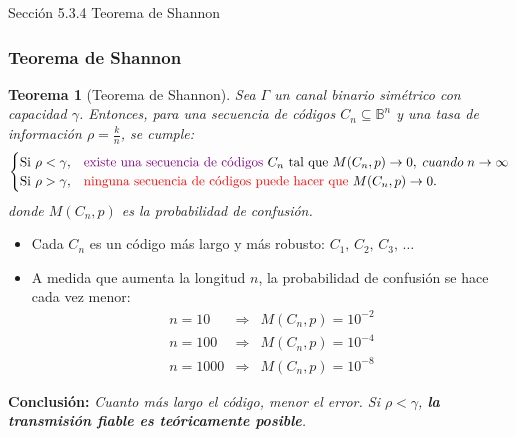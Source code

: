 \documentclass{beamer}
\theoremstyle{plain}
\newtheorem{teorema} [Teorema] {Teorema}
\theoremstyle{example}
\theoremstyle{example}
\begin{document}
\begin{frame}   \footnotesize
{
\begin{block}{Sección 5.3.4}
Teorema de Shannon
\end{block}
}
\end{frame}
\begin{frame}  \frametitle{Teorema de Shannon}\footnotesize  


\begin{teorema} [Teorema de Shannon]

Sea $\Gamma$ un canal binario simétrico con capacidad $\gamma$.
Entonces, para una secuencia de códigos $C_n \subseteq \mathbb{B}^n$ y
una tasa de información $\rho = \frac{k}{n}$, se cumple:
\[
\begin{cases}
\text{Si } \rho < \gamma, & \text{\textcolor{violet}{existe una secuencia de códigos} } C_n \text{ tal que } M(C_n, p) \to 0, \; cuando \; n \to \infty \\
\text{Si } \rho > \gamma, & \text{\textcolor{red}{ninguna secuencia de códigos puede hacer que} } M(C_n, p) \to 0.
\end{cases}
\]
donde $M(C_n, p)$ es la probabilidad de confusión.
\end{teorema}


\begin{itemize}\footnotesize
  \item Cada $C_n$ es un código más largo y más robusto: $C_1,\, C_2,\, C_3,\, \ldots$
  \item A medida que aumenta la longitud $n$, la probabilidad de confusión se hace cada vez menor:
  \[
  \begin{array}{lcl}
    n=10 &\Rightarrow& M(C_n,p) = 10^{-2} \\
    n=100 &\Rightarrow& M(C_n,p) = 10^{-4} \\
    n=1000 &\Rightarrow& M(C_n,p) = 10^{-8}
  \end{array}
  \]
\end{itemize}

\vspace{0.2em}
\centering
\textcolor{blue!70!black}{\textbf{Conclusión:}} \;
\textit{Cuanto más largo el código, menor el error.  
Si $\rho < \gamma$, \textbf{la transmisión fiable es teóricamente posible}.}

 \end{frame} 
\end{document}
